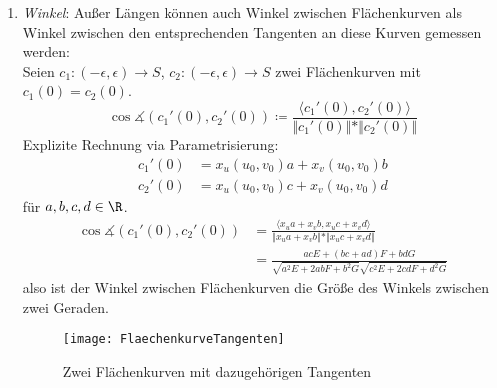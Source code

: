 \begin{remark}
\begin{enumerate}
  \item \emph{Winkel}: Außer Längen können auch Winkel zwischen Flächenkurven als Winkel zwischen den entsprechenden Tangenten an diese Kurven gemessen werden: \\
  Seien \( c_1: (-\epsilon, \epsilon) \to S \), \( c_2: (-\epsilon, \epsilon) \to S \) zwei Flächenkurven mit \( c_1(0) = c_2(0) \).
  \begin{equation*}
    \cos \measuredangle (c_1'(0),c_2'(0)) \coloneqq \frac{\langle c_1'(0), c_2'(0) \rangle}{\Vert c_1'(0) \Vert * \Vert c_2'(0) \Vert}
  \end{equation*}
  Explizite Rechnung via Parametrisierung:
  \begin{align*}
    c_1'(0) &= x_u(u_0, v_0)a + x_v(u_0,v_0)b \\
    c_2'(0) &= x_u(u_0, v_0)c + x_v(u_0,v_0)d
  \end{align*}
  für \( a,b,c,d \in \R \).
  \begin{align*}
    \cos \measuredangle (c_1'(0), c_2'(0)) &= \frac{\langle {x_u}a + {x_v}b, {x_u}c + {x_v}d \rangle}{\Vert {x_u}a + {x_v}b \Vert * \Vert {x_u}c + {x_v}d \Vert} \\
     &= \frac{acE + (bc + ad)F + bdG}{\sqrt{a^2E + 2abF + b^2G}\sqrt{c^2E + 2cdF + d^2G}}
  \end{align*}
  also ist der Winkel zwischen Flächenkurven die Größe des Winkels zwischen zwei Geraden.

  \begin{figure}[H]
    \texttt{[image: FlaechenkurveTangenten]}
    \caption{Zwei Flächenkurven mit dazugehörigen Tangenten}
  \end{figure}


\end{enumerate}
\end{remark}
